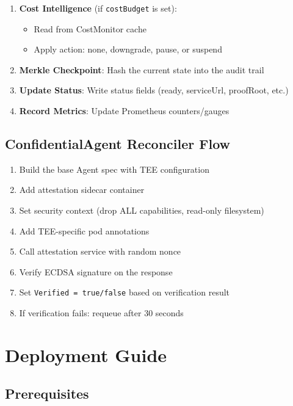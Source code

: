 \documentclass[12pt,a4paper,openany]{report}
\begin{document}
\begin{enumerate}
    \item \textbf{Cost Intelligence} (if \texttt{costBudget} is set):
    \begin{itemize}
        \item Read from CostMonitor cache
        \item Apply action: none, downgrade, pause, or suspend
    \end{itemize}

    \item \textbf{Merkle Checkpoint}: Hash the current state into the audit trail

    \item \textbf{Update Status}: Write status fields (ready, serviceUrl, proofRoot, etc.)

    \item \textbf{Record Metrics}: Update Prometheus counters/gauges
\end{enumerate}

\section{ConfidentialAgent Reconciler Flow}

\begin{enumerate}
    \item Build the base Agent spec with TEE configuration
    \item Add attestation sidecar container
    \item Set security context (drop ALL capabilities, read-only filesystem)
    \item Add TEE-specific pod annotations
    \item Call attestation service with random nonce
    \item Verify ECDSA signature on the response
    \item Set \texttt{Verified = true/false} based on verification result
    \item If verification fails: requeue after 30 seconds
\end{enumerate}


\chapter{Deployment Guide}

\section{Prerequisites}
\end{document}
